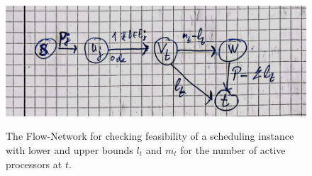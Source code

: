 \documentclass[a4paper]{article}
\begin{document}
\begin{figure}[H]
  \centering
  \includegraphics[width=\textwidth]{graphics/sketches/flow_network.png}\label{fig:flow}
  \caption{The Flow-Network for checking feasibility of a scheduling instance with lower and upper bounds $l_t$ and $m_t$ for the number of active processors at $t$.}
\end{figure}

\end{document}
